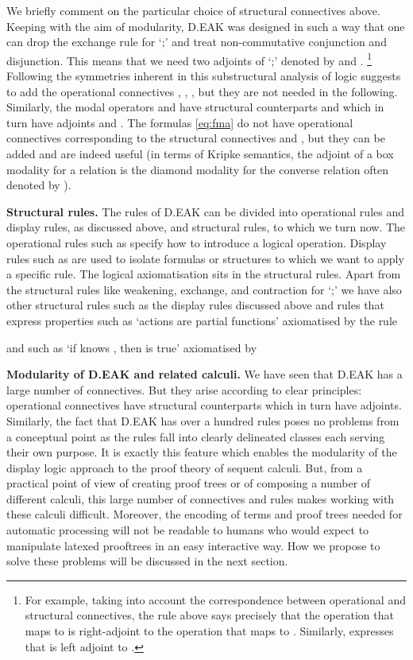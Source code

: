 \documentclass[runningheads,a4paper]{llncs}
\begin{document}
We briefly comment on the particular choice of structural connectives above.
Keeping with the aim of modularity, D.EAK was designed in such a way that one can drop the exchange rule for `;' and treat non-commutative conjunction and disjunction. This means that we need two adjoints of `;' denoted by  and .
\footnote{
For example, taking into account the correspondence between operational and structural connectives, the rule  above says precisely that the operation that maps  to  is right-adjoint to the operation that maps  to . Similarly,  expresses that   is left adjoint to .
} 
Following the symmetries inherent in this substructural analysis of logic suggests to add the operational connectives , , , but they are not needed in the following. Similarly, the modal operators  and  have structural counterparts  and  which in turn have adjoints  and . 
The formulas \eqref{eq:fma} do not have operational connectives corresponding to the structural connectives  and , but they can be added and are indeed useful (in terms of Kripke semantics, the adjoint of a box modality  for a relation  is the diamond modality for the converse relation  often denoted by ).

\medskip\noindent\textbf{Structural rules. } 
The rules of D.EAK can be divided into operational rules and display rules, as discussed above, and structural rules, to which we turn now. The operational rules such as  specify how to introduce a logical operation. Display rules such as   are used to isolate formulas or structures to which we want to apply a specific rule. The logical axiomatisation sits in the structural rules. Apart from the structural rules like weakening, exchange, and contraction for `;' we have also other structural rules such as the display rules discussed above and rules that express properties such as `actions are partial functions' axiomatised by the rule


and such as `if  knows , then  is true' axiomatised by


\medskip\noindent\textbf{Modularity of D.EAK and related calculi. }  We have seen that D.EAK  has a large number of connectives. But they arise according to clear principles: operational connectives have structural counterparts which in turn have adjoints. Similarly, the fact that D.EAK has over a hundred rules poses no problems from a conceptual point as the rules fall into clearly delineated classes each serving their own purpose. It is exactly this feature which enables the modularity of the display logic approach to the proof theory of sequent calculi. But, from a practical point of view of creating proof trees or of composing a number of different calculi, this large number of connectives and rules makes working with these calculi difficult. Moreover, the  encoding of terms and proof trees needed for automatic processing will not be readable to humans who would expect to manipulate latexed prooftrees in an easy interactive way. How we propose to solve these problems will be discussed in the next section.
\end{document}

